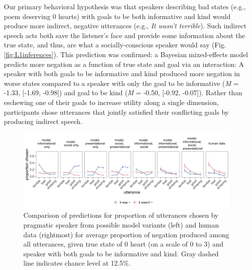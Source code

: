 \documentclass[9pt,twocolumn,twoside,lineno]{main_class_file}
\begin{document}
Our primary behavioral hypothesis was that speakers describing bad
states (e.g., poem deserving 0 hearts) with goals to be both
informative and kind would produce more indirect, negative utterances
(e.g., \emph{It wasn't terrible}). Such indirect speech acts both
save the listener's face and provide some information about the
true state, and thus, are what a socially-conscious speaker would say (Fig. \ref{fig:L1inferences}).
This prediction was confirmed: a Bayesian mixed-effects
model predicts more negation as a function of true state and goal via
an interaction: A speaker with both goals to be informative and
kind produced more negation in worse states compared to a speaker with
only the goal to be informative (\emph{M} = -1.33, {[}-1.69, -0.98{]})
and goal to be kind (\emph{M} = -0.50, {[}-0.92, -0.07{]}). Rather than
eschewing one of their goals to increase utility along a single
dimension, participants chose utterances that jointly satisfied their
conflicting goals by producing indirect speech.

\begin{figure}[!h]
\includegraphics[width=\textwidth]{fig/comparison-1} \caption{Comparison of predictions for proportion of utterances chosen by pragmatic speaker from possible model variants (left) and human data (rightmost) for average proportion of negation produced among all utterances, given true state of 0 heart (on a scale of 0 to 3) and speaker with both goals to be informative and kind. Gray dashed line indicates chance level at 12.5\%.}\label{fig:comparison}
\end{figure}
\end{document}
